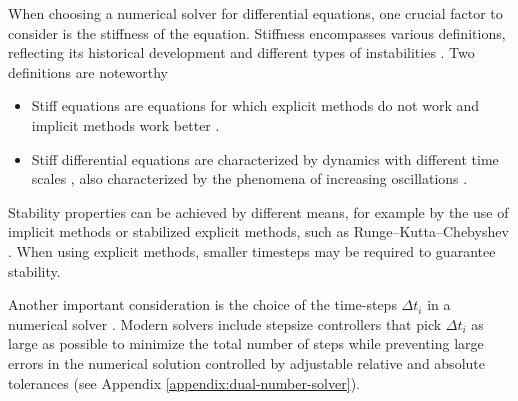 When choosing a numerical solver for differential equations, one crucial factor to consider is the stiffness of the equation.
Stiffness encompasses various definitions, reflecting its historical development and different types of instabilities \cite{Dahlquist_1985}.
Two definitions are noteworthy
\begin{itemize}
    \item Stiff equations are equations for which explicit methods do not work and implicit methods work better \cite{hairer-solving-2}.
    \item Stiff differential equations are characterized by dynamics with different time scales \cite{kim_stiff_2021}, also characterized by the phenomena of increasing oscillations \cite{Dahlquist_1985}.
\end{itemize} 
Stability properties can be achieved by different means, for example by the use of implicit methods or stabilized explicit methods, such as Runge–Kutta–Chebyshev \cite{van1980internal, hairer-solving-2}. 
When using explicit methods, smaller timesteps may be required to guarantee stability. 

Another important consideration is the choice of the time-steps $\Delta t_i$ in a numerical solver \cite{hairer-solving-1}. 
Modern solvers include stepsize controllers that pick $\Delta t_i$ as large as possible to minimize the total number of steps while preventing large errors in the numerical solution controlled by adjustable relative and absolute tolerances (see Appendix \ref{appendix:dual-number-solver}). 




